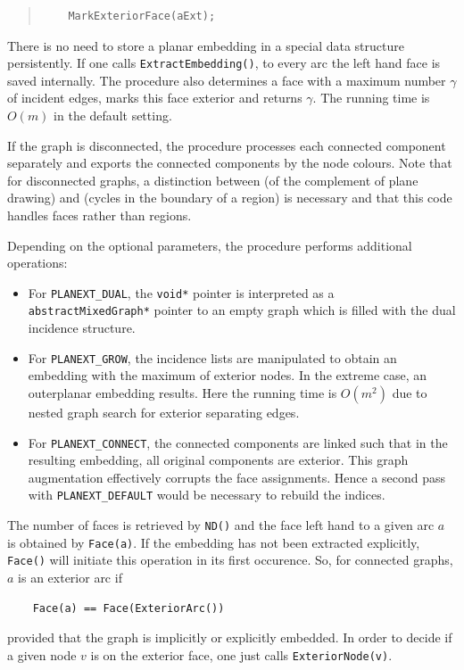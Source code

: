 \documentclass[a4paper,11pt,twoside]{book}
\begin{document}
\begin{multicols}{2}
\begin{quote}
\begin{verbatim}
    MarkExteriorFace(aExt);
\end{verbatim}
\end{quote}
There is no need to store a planar embedding in a special data structure
persistently. If one calls \verb/ExtractEmbedding()/, to every arc the
left hand face is saved internally. The procedure also determines a face
with a maximum number $\gamma$ of incident edges, marks this face exterior
and returns $\gamma$. The running time is $O(m)$ in the default setting.

If the graph is disconnected, the procedure processes each connected component
separately and exports the connected components by the node colours. Note
that for disconnected graphs, a distinction between  (of the
complement of plane drawing) and  (cycles in the boundary of a region)
is necessary and that this code handles faces rather than regions.

Depending on the optional parameters, the procedure performs additional
operations:
\begin{itemize}
\item For \verb/PLANEXT_DUAL/, the \verb/void*/ pointer is interpreted as a
    \verb/abstractMixedGraph*/ pointer to an empty graph which is filled with
    the dual incidence structure.
\item For \verb/PLANEXT_GROW/, the incidence lists are manipulated to obtain an
    embedding with the maximum of exterior nodes. In the extreme case, an
    outerplanar embedding results. Here the running time is $O(m^2)$ due to
    nested graph search for exterior separating edges.
\item For \verb/PLANEXT_CONNECT/, the connected components are linked such that
    in the resulting embedding, all original components are exterior. This graph
    augmentation effectively corrupts the face assignments. Hence a second pass
    with \verb/PLANEXT_DEFAULT/ would be necessary to rebuild the indices.
\end{itemize}
The number of faces is retrieved by \verb/ND()/ and the face left hand to a
given arc $a$ is obtained by \verb/Face(a)/. If the embedding has not been
extracted explicitly, \verb/Face()/ will initiate this operation in its first
occurence. So, for connected graphs, $a$ is an exterior arc if
\begin{verbatim}
    Face(a) == Face(ExteriorArc())
\end{verbatim}
provided that the graph is implicitly or explicitly embedded. In order to
decide if a given node $v$ is on the exterior face, one just calls
\verb/ExteriorNode(v)/.


\end{multicols}
\end{document}
